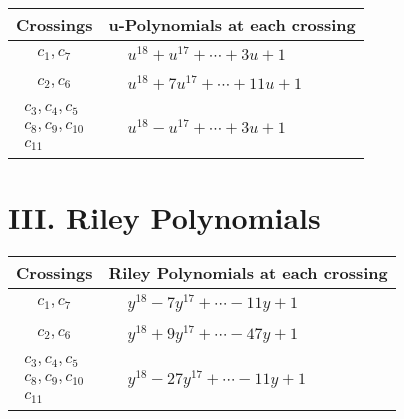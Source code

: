 \documentclass[1p]{elsarticle_modified}
\theoremstyle{definition}
\begin{document}
\begin{tabular}{m{50pt}|m{274pt}}
Crossings & \hspace{64pt}u-Polynomials at each crossing \\
\hline $$\begin{aligned}c_{1},c_{7}\end{aligned}$$&$\begin{aligned}
&u^{18}+u^{17}+\cdots+3 u+1
\end{aligned}$\\
\hline $$\begin{aligned}c_{2},c_{6}\end{aligned}$$&$\begin{aligned}
&u^{18}+7 u^{17}+\cdots+11 u+1
\end{aligned}$\\
\hline $$\begin{aligned}c_{3},c_{4},c_{5}\\c_{8},c_{9},c_{10}\\c_{11}\end{aligned}$$&$\begin{aligned}
&u^{18}- u^{17}+\cdots+3 u+1
\end{aligned}$\\
\hline
\end{tabular}\newpage\renewcommand{\arraystretch}{1}
\centering \section*{ III. Riley Polynomials}
\begin{tabular}{m{50pt}|m{274pt}}
Crossings & \hspace{64pt}Riley Polynomials at each crossing \\
\hline $$\begin{aligned}c_{1},c_{7}\end{aligned}$$&$\begin{aligned}
&y^{18}-7 y^{17}+\cdots-11 y+1
\end{aligned}$\\
\hline $$\begin{aligned}c_{2},c_{6}\end{aligned}$$&$\begin{aligned}
&y^{18}+9 y^{17}+\cdots-47 y+1
\end{aligned}$\\
\hline $$\begin{aligned}c_{3},c_{4},c_{5}\\c_{8},c_{9},c_{10}\\c_{11}\end{aligned}$$&$\begin{aligned}
&y^{18}-27 y^{17}+\cdots-11 y+1
\end{aligned}$\\
\hline
\end{tabular}
\vskip 2pc
\end{document}
